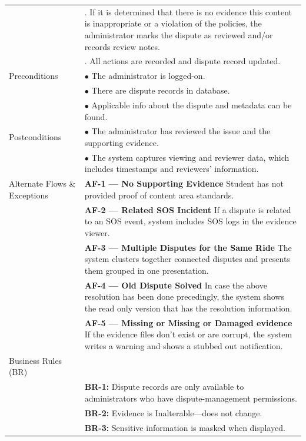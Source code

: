 \begin{longtable}{|>{\raggedright\arraybackslash}p{4cm}|>{\raggedright\arraybackslash}p{11cm}|}
& 7. If it is determined that there is no evidence this content is inappropriate or a violation of the policies, the administrator marks the dispute as reviewed and/or records review notes. \\
& 8. All actions are recorded and dispute record updated. \\
\hline
Preconditions & $\bullet$ The administrator is logged-on. \\
& $\bullet$ There are dispute records in database. \\
& $\bullet$ Applicable info about the dispute and metadata can be found. \\
\hline
Postconditions & $\bullet$ The administrator has reviewed the issue and the supporting evidence. \\
& $\bullet$ The system captures viewing and reviewer data, which includes timestamps and reviewers' information. \\
\hline
Alternate Flows \& Exceptions & \textbf{AF-1 — No Supporting Evidence} \newline Student has not provided proof of content area standards. \\
& \textbf{AF-2 — Related SOS Incident} \newline If a dispute is related to an SOS event, system includes SOS logs in the evidence viewer. \\
& \textbf{AF-3 — Multiple Disputes for the Same Ride} \newline The system clusters together connected disputes and presents them grouped in one presentation. \\
& \textbf{AF-4 — Old Dispute Solved} \newline In case the above resolution has been done precedingly, the system shows the read only version that has the resolution information. \\
& \textbf{AF-5 — Missing or Missing or Damaged evidence} \newline If the evidence files don't exist or are corrupt, the system writes a warning and shows a stubbed out notification. \\
\hline
Business Rules (BR) & \\
& \textbf{BR-1:} Dispute records are only available to administrators who have dispute-management permissions. \\
& \textbf{BR-2:} Evidence is Inalterable—does not change. \\
& \textbf{BR-3:} Sensitive information is masked when displayed. \\

\end{longtable}
